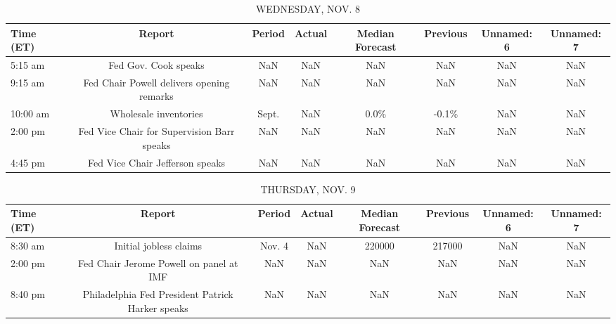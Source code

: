 \documentclass{article}%
\begin{document}
%


\begin{table}[htbp]%
\caption{WEDNESDAY, NOV. 8}%
\centering%
\begin{adjustbox}{width=1\textwidth}%
\begin{tabular}{lccccccc}
\toprule
Time (ET) &                                     Report & Period & Actual & Median Forecast & Previous & Unnamed: 6 & Unnamed: 7 \\
\midrule
  5:15 am &                       Fed Gov. Cook speaks &    NaN &    NaN &             NaN &      NaN &        NaN &        NaN \\
  9:15 am &  Fed Chair Powell delivers opening remarks &    NaN &    NaN &             NaN &      NaN &        NaN &        NaN \\
 10:00 am &                      Wholesale inventories &  Sept. &    NaN &            0.0\% &    -0.1\% &        NaN &        NaN \\
  2:00 pm & Fed Vice Chair for Supervision Barr speaks &    NaN &    NaN &             NaN &      NaN &        NaN &        NaN \\
  4:45 pm &            Fed Vice Chair Jefferson speaks &    NaN &    NaN &             NaN &      NaN &        NaN &        NaN \\
\bottomrule
\end{tabular}
%
\end{adjustbox}%
\end{table}

%


\begin{table}[htbp]%
\caption{THURSDAY, NOV. 9}%
\centering%
\begin{adjustbox}{width=1\textwidth}%
\begin{tabular}{lccccccc}
\toprule
Time (ET) &                                           Report & Period & Actual & Median Forecast & Previous & Unnamed: 6 & Unnamed: 7 \\
\midrule
  8:30 am &                           Initial jobless claims & Nov. 4 &    NaN &          220000 &   217000 &        NaN &        NaN \\
  2:00 pm &          Fed Chair Jerome Powell on panel at IMF &    NaN &    NaN &             NaN &      NaN &        NaN &        NaN \\
  8:40 pm & Philadelphia Fed President Patrick Harker speaks &    NaN &    NaN &             NaN &      NaN &        NaN &        NaN \\
\bottomrule
\end{tabular}
%
\end{adjustbox}%
\end{table}
\end{document}
